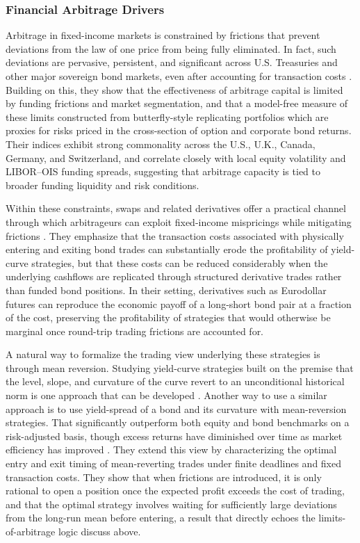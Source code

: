 \documentclass[12pt]{article}
\begin{document}
\subsubsection{Financial Arbitrage Drivers}

Arbitrage in fixed-income markets is constrained by frictions that prevent deviations from the law of one price from being fully eliminated. In fact, such deviations are pervasive, persistent, and significant across U.S. Treasuries and other major sovereign bond markets, even after accounting for transaction costs \parencite{Fontaine2019MEASURINGMARKETS}. Building on this, they show that the effectiveness of arbitrage capital is limited by funding frictions and market segmentation, and that a model-free measure of these limits constructed from butterfly-style replicating portfolios which are proxies for risks priced in the cross-section of option and corporate bond returns. Their indices exhibit strong commonality across the U.S., U.K., Canada, Germany, and Switzerland, and correlate closely with local equity volatility and LIBOR–OIS funding spreads, suggesting that arbitrage capacity is tied to broader funding liquidity and risk conditions.

Within these constraints, swaps and related derivatives offer a practical channel through which arbitrageurs can exploit fixed-income mispricings while mitigating frictions \parencite{TzeCHUA2006ProfitingStrategies}. They emphasize that the transaction costs associated with physically entering and exiting bond trades can substantially erode the profitability of yield-curve strategies, but that these costs can be reduced considerably when the underlying cashflows are replicated through structured derivative trades rather than funded bond positions. In their setting, derivatives such as Eurodollar futures can reproduce the economic payoff of a long-short bond pair at a fraction of the cost, preserving the profitability of strategies that would otherwise be marginal once round-trip trading frictions are accounted for.

A natural way to formalize the trading view underlying these strategies is through mean reversion. Studying yield-curve strategies built on the premise that the level, slope, and curvature of the curve revert to an unconditional historical norm is one approach that can be developed \parencite{TzeCHUA2006ProfitingStrategies}. Another way to use a similar approach is to use yield-spread of a bond and its curvature with mean-reversion strategies. That significantly outperform both equity and bond benchmarks on a risk-adjusted basis, though excess returns have diminished over time as market efficiency has improved \parencite{Kitapbayev2018MeanCosts}. They extend this view by characterizing the optimal entry and exit timing of mean-reverting trades under finite deadlines and fixed transaction costs. They show that when frictions are introduced, it is only rational to open a position once the expected profit exceeds the cost of trading, and that the optimal strategy involves waiting for sufficiently large deviations from the long-run mean before entering, a result that directly echoes the limits-of-arbitrage logic discuss above.
\end{document}
